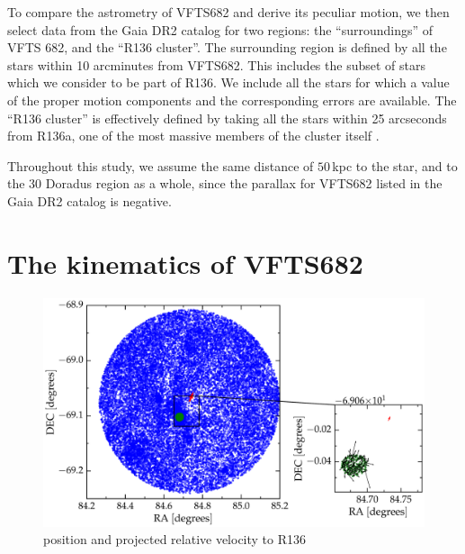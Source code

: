 \documentclass{aa}
\begin{document}
To compare the astrometry of VFTS682 and derive its peculiar motion,
we then select data from the Gaia DR2 catalog for two regions: the
``surroundings'' of VFTS 682, and the ``R136 cluster''. The
surrounding region is defined by all the stars within 10 arcminutes from
VFTS682. This includes the subset of stars which we consider to be
part of R136. We include all the stars for which a value of the proper
motion components and the corresponding errors are available.
The ``R136 cluster'' is effectively defined by taking all the stars
within 25 arcseconds from R136a, one of the most massive members of
the cluster itself \citep[][]{crowther:10}.


Throughout this study, we assume the same distance of $50$\,kpc to the star, and to
the 30 Doradus region as a whole, since the parallax for VFTS682
listed in the Gaia DR2 catalog is negative.





\section{The kinematics of VFTS682}


\begin{figure}[htbp]
  \centering
  \includegraphics[width=\textwidth]{./figures/main_plot}  
  \caption{position and projected relative velocity to R136}
  \label{fig:main}
\end{figure}





\end{document}
